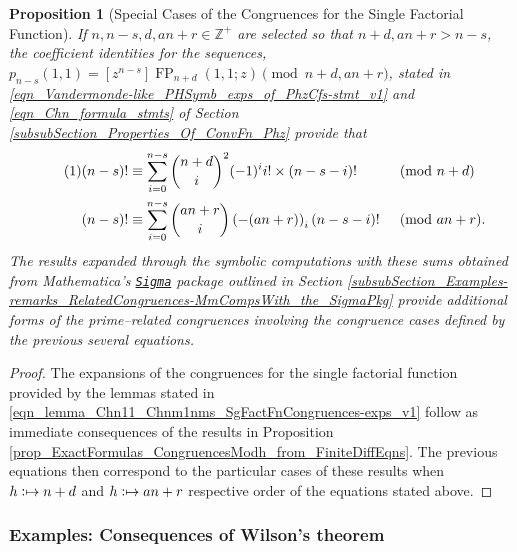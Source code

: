 \documentclass[12pt,reqno]{article}
\numberwithin{sfootnote}{section}
\numberwithin{equation}{section}
\newcommand{\tagonce}[0]{
     \addtocounter{equation}{1}
     \tag{\theequation}
}
\theoremstyle{DefaultTheoremStyle}
\newtheorem{prop}[theorem]{Proposition}
\theoremstyle{definition}
\newcommand{\defmapsto}{\ensuremath{\vcentcolon\mapsto}}
\newcommand{\Mm}[0]{\emph{Mathematica}}
\newcommand{\SigmaPkg}[0]{%
     \href{http://www.risc.jku.at/research/combinat/software/Sigma/index.php}{%
     \texttt{Sigma}}
}
\newcommand{\Pochhammer}[2]{\ensuremath{\left(#1\right)_{#2}}}
\newcommand{\pn}[3]{\ensuremath{p_{#1}\left(#2, #3\right)}}
\newcommand{\ConvFP}[4]{\ensuremath{\FP_{#1}\left(#2, #3; #4\right)}}
\DeclareMathOperator{\FP}{FP}
\begin{document}
\begin{prop}[Special Cases of the Congruences for the Single Factorial Function]  
If $n,n-s,d,an+r \in \mathbb{Z}^{+}$ are selected so that 
$n+d, an+r > n-s$, the coefficient identities for the sequences, 
$\pn{n-s}{1}{1} = [z^{n-s}] \ConvFP{n+d}{1}{1}{z} \pmod{n+d, an+r}$, stated in 
\eqref{eqn_Vandermonde-like_PHSymb_exps_of_PhzCfs-stmt_v1} and 
\eqref{eqn_Chn_formula_stmts} of 
Section \ref{subsubSection_Properties_Of_ConvFn_Phz} 
provide that 
\begin{align*} 
\tagonce\label{eqn_SingFactFn_nms_first_ChnSumExps_Modnpd_Modanpr-stmts_v1} 
(n-s)! 
     & \equiv \sum_{i=0}^{n-s} \binom{n+d}{i}^{2} (-1)^{i} i! \times 
     (n-s-i)! && \pmod{n+d} \\ 
(n-s)! 
     & \equiv \sum_{i=0}^{n-s} \binom{an+r}{i} 
     \Pochhammer{-(an+r)}{i} (n-s-i)! && \pmod{an+r}. %
\end{align*} 
The results expanded through the symbolic computations with these sums 
obtained from \Mm{}'s \SigmaPkg package outlined in 
Section \ref{subsubSection_Examples-remarks_RelatedCongruences-MmCompsWith_the_SigmaPkg}
provide additional forms of the prime--related congruences 
involving the congruence cases defined by the previous several equations. 
\end{prop} 
\begin{proof} 
The expansions of the congruences for the single factorial function 
provided by the lemmas stated in 
\eqref{eqn_lemma_Chn11_Chnm1nms_SgFactFnCongruences-exps_v1} 
follow as immediate consequences of the results in 
Proposition \ref{prop_ExactFormulas_CongruencesModh_from_FiniteDiffEqns}. 
The previous equations then correspond to the particular cases of these 
results when $h \defmapsto n+d$ and $h \defmapsto an+r$ 
respective order of the equations stated above. 
\end{proof} 

\subsubsection{Examples: Consequences of Wilson's theorem} 
\end{document}
